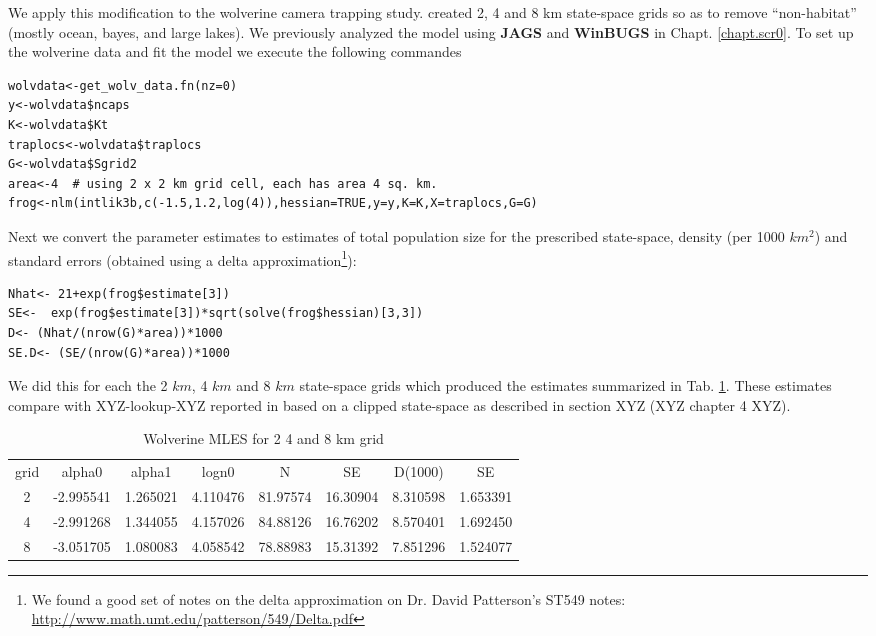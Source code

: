 We apply this modification to the wolverine camera trapping
study. \citet{royle_etal:2011jwm} created 2, 4 and 8 km state-space
grids so as to remove ``non-habitat'' (mostly ocean, bayes, and large
lakes). We previously analyzed the model using {\bf JAGS} and {\bf WinBUGS} in
Chapt. \ref{chapt.scr0}.  To set up the wolverine data and fit the
model we execute the following commandes
\begin{verbatim}
wolvdata<-get_wolv_data.fn(nz=0)
y<-wolvdata$ncaps
K<-wolvdata$Kt
traplocs<-wolvdata$traplocs
G<-wolvdata$Sgrid2
area<-4  # using 2 x 2 km grid cell, each has area 4 sq. km.
frog<-nlm(intlik3b,c(-1.5,1.2,log(4)),hessian=TRUE,y=y,K=K,X=traplocs,G=G)
\end{verbatim}
Next we convert the parameter estimates to estimates of total
population size for the prescribed state-space, density (per 1000
$km^2$) and standard errors (obtained using a delta
approximation\footnote{
We found a good set of notes on the delta approximation on Dr. David
Patterson's ST549 notes: 
\url{http://www.math.umt.edu/patterson/549/Delta.pdf}
}):
\begin{verbatim}
Nhat<- 21+exp(frog$estimate[3])
SE<-  exp(frog$estimate[3])*sqrt(solve(frog$hessian)[3,3])
D<- (Nhat/(nrow(G)*area))*1000
SE.D<- (SE/(nrow(G)*area))*1000
\end{verbatim}
We did this for each the 2 $km$, 4 $km$ and 8 $km$ state-space grids
which produced the estimates summarized in Tab. \ref{mle.tab.wolv}.
These estimates compare with XYZ-lookup-XYZ reported in
\citet{royle_etal:2011jwm} based on a clipped state-space as described
in section XYZ (XYZ chapter 4 XYZ).

\begin{table}
\centering
\caption{Wolverine MLES for 2 4 and 8 km grid}
\begin{tabular}{cccccccc}
grid &  alpha0  &  alpha1 &   logn0  & N   &  SE & D(1000) &  SE \\
2  &  -2.995541& 1.265021 &4.110476 &81.97574& 16.30904 &8.310598 &1.653391\\
4  &  -2.991268&1.344055  &4.157026 &84.88126& 16.76202 &8.570401& 1.692450\\
8   & -3.051705& 1.080083 &4.058542 &78.88983& 15.31392 &7.851296& 1.524077\\
\end{tabular}
\label{mle.tab.wolv}
\end{table}


\begin{comment}
\subsection{
Exercises
}

{\flushleft
1.	Compute the 95\% confidence interval for wolverine density,
somehow. Comment on the practical implication of this level of precision.
}

{\flushleft
2.	Compute the AIC of this model and modify \mbox{\tt intlik3}
 to consider alternative link functions (at least one additional) and
 compare the  AIC of the different models and the estimates. Comment. 
}
\end{comment}


